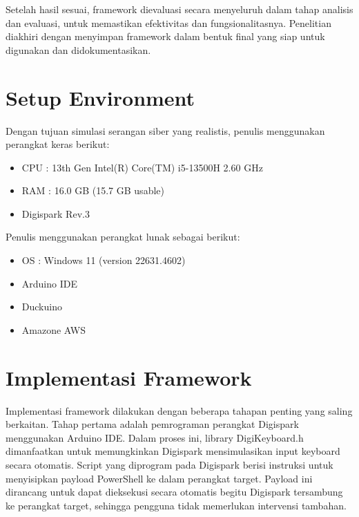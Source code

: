 Setelah hasil sesuai, framework dievaluasi secara menyeluruh dalam tahap analisis dan evaluasi, untuk memastikan efektivitas dan fungsionalitasnya. Penelitian diakhiri dengan menyimpan framework dalam bentuk final yang siap untuk digunakan dan didokumentasikan.

\section{Setup Environment}
Dengan tujuan simulasi serangan siber yang realistis, penulis menggunakan perangkat keras berikut:
\begin{itemize}
    \item CPU   : 13th Gen Intel(R) Core(TM) i5-13500H   2.60 GHz
    \item RAM   : 16.0 GB (15.7 GB usable)
    \item Digispark Rev.3

\end{itemize}

Penulis menggunakan perangkat lunak sebagai berikut:
\begin{itemize}
    \item OS    : Windows 11 (version 22631.4602)
    \item Arduino IDE
    \item Duckuino
    \item Amazone AWS

\end{itemize}


\section{Implementasi Framework}
Implementasi framework dilakukan dengan beberapa tahapan penting yang saling berkaitan. Tahap pertama adalah pemrograman perangkat Digispark menggunakan Arduino IDE. Dalam proses ini, library DigiKeyboard.h dimanfaatkan untuk memungkinkan Digispark mensimulasikan input keyboard secara otomatis. Script yang diprogram pada Digispark berisi instruksi untuk menyisipkan payload PowerShell ke dalam perangkat target. Payload ini dirancang untuk dapat dieksekusi secara otomatis begitu Digispark tersambung ke perangkat target, sehingga pengguna tidak memerlukan intervensi tambahan.


